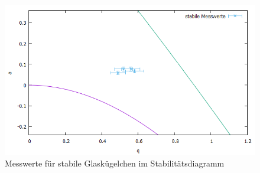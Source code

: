 \documentclass[10pt,a4paper]{article}
\begin{document}
\begin{figure}[h]
	\includegraphics[scale = 0.7]{stabiler_bereich.png}
	\centering
	\caption{Messwerte für stabile Glaskügelchen im Stabilitätsdiagramm}
	\label{stabiler_bereich1}
\end{figure}
\end{document}
